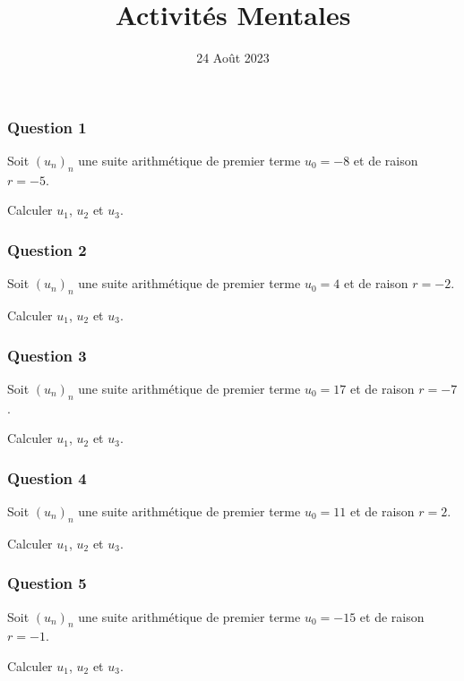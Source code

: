 \documentclass[15pt, mathserif]{beamer}
\title{Activités Mentales}
\date{24 Août 2023}
\begin{document}
\begin{frame}
    \titlepage
\end{frame}

\begin{frame} 
	\frametitle{Question 1}
Soit $(u_n)_n$ une suite arithmétique de premier terme $u_0=-8$ et de raison $r=-5$. 
 
 Calculer $u_1$, $u_2$ et $u_3$.\end{frame}


\begin{frame} 
	\frametitle{Question 2}
Soit $(u_n)_n$ une suite arithmétique de premier terme $u_0=4$ et de raison $r=-2$. 
 
 Calculer $u_1$, $u_2$ et $u_3$.\end{frame}


\begin{frame} 
	\frametitle{Question 3}
Soit $(u_n)_n$ une suite arithmétique de premier terme $u_0=17$ et de raison $r=-7$. 
 
 Calculer $u_1$, $u_2$ et $u_3$.\end{frame}


\begin{frame} 
	\frametitle{Question 4}
Soit $(u_n)_n$ une suite arithmétique de premier terme $u_0=11$ et de raison $r=2$. 
 
 Calculer $u_1$, $u_2$ et $u_3$.\end{frame}


\begin{frame} 
	\frametitle{Question 5}
Soit $(u_n)_n$ une suite arithmétique de premier terme $u_0=-15$ et de raison $r=-1$. 
 
 Calculer $u_1$, $u_2$ et $u_3$.\end{frame}
\end{document}
